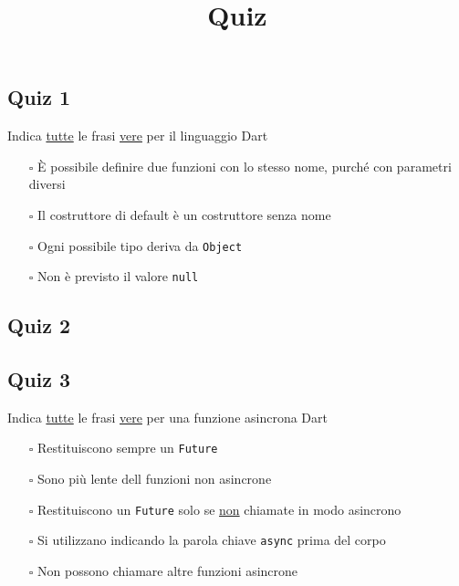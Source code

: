 \documentclass{article}
\title{Quiz}
\begin{document}
\subsection*{Quiz 1}
Indica \underline{tutte} le frasi \underline{vere} per il linguaggio Dart
\begin{itemize}
  \item[$\square$] È possibile definire due funzioni con lo stesso nome, purché con parametri diversi
  \item[$\square$] Il costruttore di default è un costruttore senza nome
  \item[$\square$] Ogni possibile tipo deriva da \texttt{Object}
  \item[$\square$] Non è previsto il valore \texttt{null}
\end{itemize}
\subsection*{Quiz 2}

\begin{itemize}
\end{itemize}
\subsection*{Quiz 3}
Indica \underline{tutte} le frasi \underline{vere} per una funzione asincrona Dart
\begin{itemize}
  \item[$\square$] Restituiscono sempre un \texttt{Future}
  \item[$\square$] Sono più lente dell funzioni non asincrone
  \item[$\square$] Restituiscono un \texttt{Future} solo se \underline{non} chiamate in modo asincrono
  \item[$\square$] Si utilizzano indicando la parola chiave \texttt{async} prima del corpo
  \item[$\square$] Non possono chiamare altre funzioni asincrone
\end{itemize}
\end{document}
